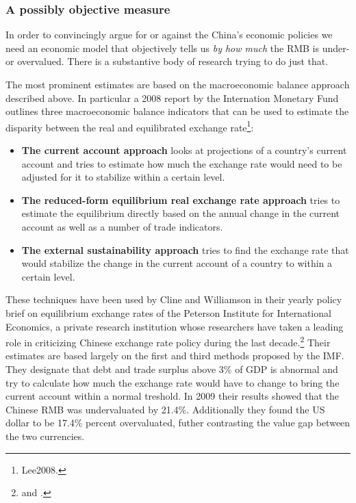 
\subsubsection{A possibly objective measure}

In order to convincingly argue for or against the China's economic 
policies we need an economic model that objectively tells us \emph{by 
how much} the RMB is under- or overvalued. There is a substantive body 
of research trying to do just that.

The most prominent estimates are based on the macroeconomic balance 
approach described above. In particular a 2008 report by the Internation 
Monetary Fund outlines three macroeconomic balance indicators that can 
be used to estimate the disparity between the real and equilibrated 
exchange rate\footnote{\cite{pp. 1}{Lee2008}.}:

\begin{itemize}
	\item{\textbf{The current account approach} looks at projections of 
		a country's current account and tries to estimate how much the 
	exchange rate would need to be adjusted for it to stabilize within a 
certain level.}
\item{\textbf{The reduced-form equilibrium real exchange rate approach}
	tries to estimate the equilibrium directly based on the annual 
change in the current account as well as a number of trade indicators.}
\item{\textbf{The external sustainability approach} tries to find the 
	exchange rate that would stabilize the change in the current account 
of a country to within a certain level.}
\end{itemize}

These techniques have been used by Cline and Williamson in 
their yearly policy brief on equilibrium exchange rates of the Peterson 
Institute for International Economics, a private research institution 
whose researchers have taken a leading role in criticizing Chinese 
exchange rate policy during the last decade.\footnote{\cite{Cline2009} 
and \cite{Cline2012}.} Their estimates are based largely on the first 
and third methods proposed by the IMF. They designate that debt and 
trade surplus above 3\% of GDP is abnormal and try to calculate how much 
the exchange rate would have to change to bring the current account 
within a normal treshold. In 2009 their results showed that the Chinese 
RMB was undervaluated by 21.4\%.  Additionally they found the US dollar 
to be 17.4\% percent overvaluated, futher contrasting the value gap 
between the two currencies.

